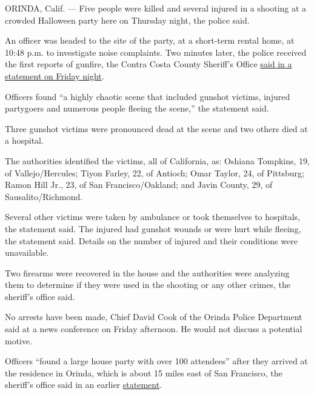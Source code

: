 ORINDA, Calif. --- Five people were killed and several injured in a
shooting at a crowded Halloween party here on Thursday night, the police
said.

An officer was headed to the site of the party, at a short-term rental
home, at 10:48 p.m. to investigate noise complaints. Two minutes later,
the police received the first reports of gunfire, the Contra Costa
County Sheriff's Office
\href{https://www.facebookcorewwwi.onion/permalink.php?story_fbid=10156428769671561\&id=224837426560\&__xts__\%5B0\%5D=68.ARCXeP1wFCRNAU9OpvoWWFXS-TtmY3KBb2vlieuUR5OjOvtp2QDRET892rJ8vVptbzhb3kDh_i-HgZ7K2HYVdNrWobQAFZKZSU78r4YbHeu1My5BlnpAHqKp12AHb3qK05fTz8L9hv5YvdLJSjFlG185oo03rnYnKRWtajznUNy84H94HIJRYpPVhMuPoZH9PXUelAv0cZZYEa_gWwQ5a-sboAaHMM-CIY569nLOv9p2qIqQ_1l05LvNn4Q5cOUm3-U76-9kA04BEky7kpMrM1P12Lp7heuoxkPY_IrqQVnM_qPNfLrBElaPB1yGqfaJVwfXHZm1kqic5DGJ\&__tn__=-R}{said
in a statement on Friday night}.

Officers found ``a highly chaotic scene that included gunshot victims,
injured partygoers and numerous people fleeing the scene,'' the
statement said.

Three gunshot victims were pronounced dead at the scene and two others
died at a hospital.

The authorities identified the victims, all of California, as: Oshiana
Tompkins, 19, of Vallejo/Hercules; Tiyon Farley, 22, of Antioch; Omar
Taylor, 24, of Pittsburg; Ramon Hill Jr., 23, of San Francisco/Oakland;
and Javin County, 29, of Sausalito/Richmond.

Several other victims were taken by ambulance or took themselves to
hospitals, the statement said. The injured had gunshot wounds or were
hurt while fleeing, the statement said. Details on the number of injured
and their conditions were unavailable.

Two firearms were recovered in the house and the authorities were
analyzing them to determine if they were used in the shooting or any
other crimes, the sheriff's office said.

No arrests have been made, Chief David Cook of the Orinda Police
Department said at a news conference on Friday afternoon. He would not
discuss a potential motive.

Officers ``found a large house party with over 100 attendees'' after
they arrived at the residence in Orinda, which is about 15 miles east of
San Francisco, the sheriff's office said in an earlier
\href{https://www.facebookcorewwwi.onion/permalink.php?story_fbid=10156427464221561\&id=224837426560}{statement}.

